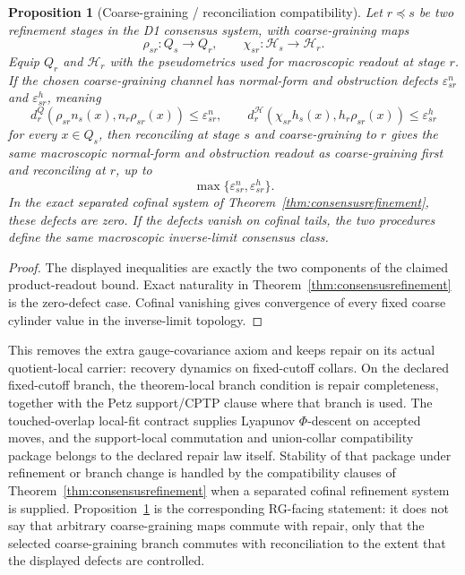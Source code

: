 \documentclass[11pt]{article}
\newtheorem{proposition}[theorem]{Proposition}
\begin{document}
\begin{proposition}[Coarse-graining / reconciliation compatibility]\label{prop:consensuscoarse}
Let \(r\preceq s\) be two refinement stages in the D1 consensus system, with coarse-graining
maps
\[
\rho_{sr}:Q_s\to Q_r,\qquad \chi_{sr}:\mathcal H_s\to\mathcal H_r.
\]
Equip \(Q_r\) and \(\mathcal H_r\) with the pseudometrics used for macroscopic readout at stage
\(r\). If the chosen coarse-graining channel has normal-form and obstruction defects
\(\varepsilon^n_{sr}\) and \(\varepsilon^h_{sr}\), meaning
\[
d^Q_r(\rho_{sr}n_s(x),n_r\rho_{sr}(x))\le\varepsilon^n_{sr},
\qquad
d^{\mathcal H}_r(\chi_{sr}h_s(x),h_r\rho_{sr}(x))\le\varepsilon^h_{sr}
\]
for every \(x\in Q_s\), then reconciling at stage \(s\) and coarse-graining to \(r\) gives the
same macroscopic normal-form and obstruction readout as coarse-graining first and reconciling at
\(r\), up to
\[
\max\{\varepsilon^n_{sr},\varepsilon^h_{sr}\}.
\]
In the exact separated cofinal system of Theorem~\ref{thm:consensusrefinement}, these defects are
zero. If the defects vanish on cofinal tails, the two procedures define the same macroscopic
inverse-limit consensus class.
\end{proposition}

\begin{proof}
The displayed inequalities are exactly the two components of the claimed product-readout bound.
Exact naturality in Theorem~\ref{thm:consensusrefinement} is the zero-defect case. Cofinal
vanishing gives convergence of every fixed coarse cylinder value in the inverse-limit topology.
\end{proof}

This removes the extra gauge-covariance axiom and keeps repair on its actual quotient-local
carrier: recovery dynamics on fixed-cutoff collars. On the declared fixed-cutoff branch, the
theorem-local branch condition is repair completeness, together with the Petz support/CPTP clause
where that branch is used. The touched-overlap local-fit contract supplies Lyapunov
\(\Phi\)-descent on accepted moves, and the support-local commutation and union-collar
compatibility package belongs to the declared repair law itself. Stability of that package under
refinement or branch change is handled by the compatibility clauses of
Theorem~\ref{thm:consensusrefinement} when a separated cofinal refinement system is supplied.
Proposition~\ref{prop:consensuscoarse} is the corresponding RG-facing statement: it does not say
that arbitrary coarse-graining maps commute with repair, only that the selected coarse-graining
branch commutes with reconciliation to the extent that the displayed defects are controlled.
\end{document}
